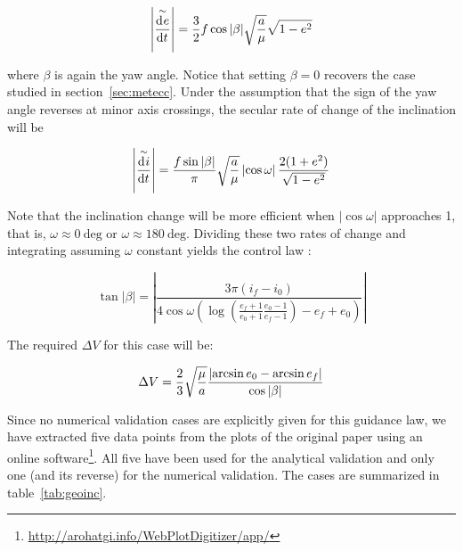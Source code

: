 \[
\left| \overset{\sim}{\frac{\operatorname{d}\!^{} e}{\operatorname{d}\! t^{}}} \right| = \frac{3}{2} f \cos{\left| \beta \right|} \sqrt{\frac{a}{\mu}} \sqrt{1 - e^2}
\]

where $\beta$ is again the yaw angle. Notice that setting $\beta = 0$ recovers the case studied in section~\ref{sec:metecc}. Under the assumption that the sign of the yaw angle reverses at minor axis crossings, the secular rate of change of the inclination will be

\[
\left| \overset{\sim}{\frac{\operatorname{d}\!^{} i}{\operatorname{d}\! t^{}}} \right| = \frac{f \sin{\left| \beta \right|}}{\pi} \sqrt{\frac{a}{\mu}} \left| \cos{\omega} \right| \frac{2 (1 + e^2)}{\sqrt{1 - e^2}}
\]

Note that the inclination change will be more efficient when $\left| \cos{\omega} \right|$ approaches 1, that is, $\omega \approx 0~\text{deg}$ or $\omega \approx 180~\text{deg}$. Dividing these two rates of change and integrating assuming $\omega$ constant yields the control law \cite{pollard2000simplified}:

\[
\tan{\left| \beta \right|} = \left| \frac{3 \pi (i_f - i_0)}{4 \cos{\omega} \left( \log{\left(\frac{e_f + 1}{e_0 + 1} \frac{e_0 - 1}{e_f - 1}\right)} - e_f + e_0 \right)} \right|
\]

The required $\Delta V$ for this case will be:

\[
\Delta V = \frac{2}{3} \sqrt{\frac{\mu}{a}} \frac{\left| \arcsin{e_0} - \arcsin{e_f} \right|}{\cos{\left| \beta \right|}}
\]

Since no numerical validation cases are explicitly given for this guidance law, we have extracted five data points from the plots of the original paper using an online software\footnote{\url{http://arohatgi.info/WebPlotDigitizer/app/}}. All five have been used for the analytical validation and only one (and its reverse) for the numerical validation. The cases are summarized in table~\ref{tab:geoinc}.
